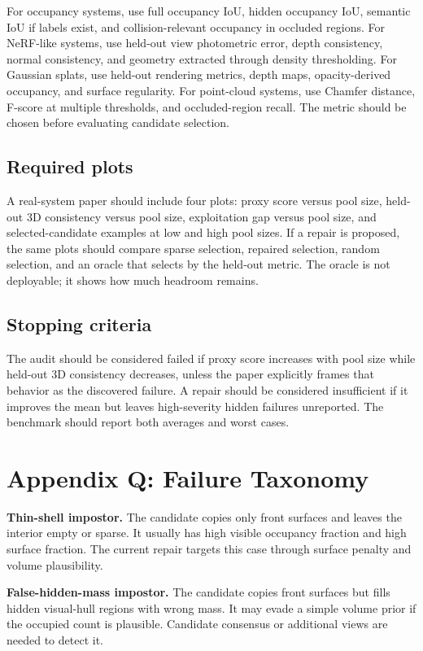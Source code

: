\documentclass{article}
\begin{document}
For occupancy systems, use full occupancy IoU, hidden occupancy IoU, semantic
IoU if labels exist, and collision-relevant occupancy in occluded regions. For
NeRF-like systems, use held-out view photometric error, depth consistency,
normal consistency, and geometry extracted through density thresholding. For
Gaussian splats, use held-out rendering metrics, depth maps, opacity-derived
occupancy, and surface regularity. For point-cloud systems, use Chamfer
distance, F-score at multiple thresholds, and occluded-region recall. The
metric should be chosen before evaluating candidate selection.

\subsection{Required plots}

A real-system paper should include four plots: proxy score versus pool size,
held-out 3D consistency versus pool size, exploitation gap versus pool size,
and selected-candidate examples at low and high pool sizes. If a repair is
proposed, the same plots should compare sparse selection, repaired selection,
random selection, and an oracle that selects by the held-out metric. The oracle
is not deployable; it shows how much headroom remains.

\subsection{Stopping criteria}

The audit should be considered failed if proxy score increases with pool size
while held-out 3D consistency decreases, unless the paper explicitly frames
that behavior as the discovered failure. A repair should be considered
insufficient if it improves the mean but leaves high-severity hidden failures
unreported. The benchmark should report both averages and worst cases.

\section{Appendix Q: Failure Taxonomy}

\textbf{Thin-shell impostor.}
The candidate copies only front surfaces and leaves the interior empty or
sparse. It usually has high visible occupancy fraction and high surface
fraction. The current repair targets this case through surface penalty and
volume plausibility.

\textbf{False-hidden-mass impostor.}
The candidate copies front surfaces but fills hidden visual-hull regions with
wrong mass. It may evade a simple volume prior if the occupied count is
plausible. Candidate consensus or additional views are needed to detect it.
\end{document}
